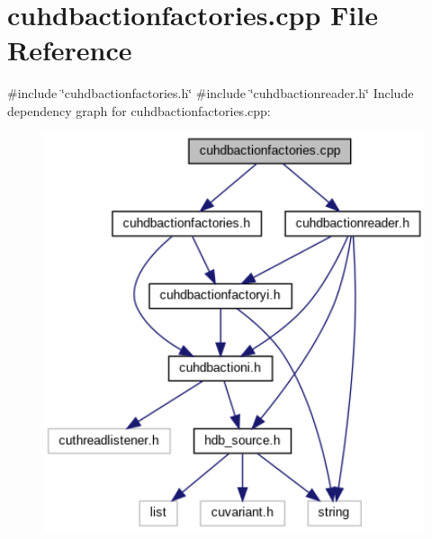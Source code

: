 \section{cuhdbactionfactories.\+cpp File Reference}
\label{cuhdbactionfactories_8cpp}
{\ttfamily \#include \char`\"{}cuhdbactionfactories.\+h\char`\"{}}\newline
{\ttfamily \#include \char`\"{}cuhdbactionreader.\+h\char`\"{}}\newline
Include dependency graph for cuhdbactionfactories.\+cpp\+:
\nopagebreak
\begin{figure}[H]
\begin{center}
\leavevmode
\includegraphics[width=350pt]{cuhdbactionfactories_8cpp__incl}
\end{center}
\end{figure}
